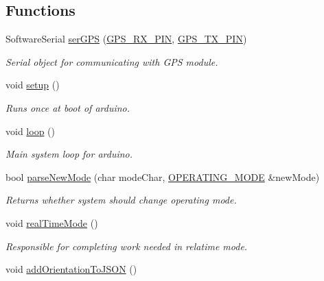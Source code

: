 \subsection*{Functions}
\begin{DoxyCompactItemize}
\item 
\mbox{\label{logging-device_8ino_aa2475f51bdc0f31d16d2916991d618d9}} 
Software\+Serial \hyperlink{logging-device_8ino_aa2475f51bdc0f31d16d2916991d618d9}{ser\+G\+PS} (\hyperlink{logging-device_8ino_a6f8927970de9eedcbb8f6c14b1d0d6c3}{G\+P\+S\+\_\+\+R\+X\+\_\+\+P\+IN}, \hyperlink{logging-device_8ino_acae14b9c1767cfec367a4b96009c94e5}{G\+P\+S\+\_\+\+T\+X\+\_\+\+P\+IN})
\begin{DoxyCompactList}\small\item\em Serial object for communicating with G\+PS module. \end{DoxyCompactList}\item 
void \hyperlink{logging-device_8ino_a4fc01d736fe50cf5b977f755b675f11d}{setup} ()
\begin{DoxyCompactList}\small\item\em Runs once at boot of arduino. \end{DoxyCompactList}\item 
void \hyperlink{logging-device_8ino_afe461d27b9c48d5921c00d521181f12f}{loop} ()
\begin{DoxyCompactList}\small\item\em Main system loop for arduino. \end{DoxyCompactList}\item 
bool \hyperlink{logging-device_8ino_aec1eb39e3cfde6331c4d29938c952c84}{parse\+New\+Mode} (char mode\+Char, \hyperlink{logging-device_8ino_a980e950615d86dadef54f3cfaefb5fb4}{O\+P\+E\+R\+A\+T\+I\+N\+G\+\_\+\+M\+O\+DE} \&new\+Mode)
\begin{DoxyCompactList}\small\item\em Returns whether system should change operating mode. \end{DoxyCompactList}\item 
void \hyperlink{logging-device_8ino_ab4c1c4c0fa047e336f9f4176406a54f1}{real\+Time\+Mode} ()
\begin{DoxyCompactList}\small\item\em Responsible for completing work needed in relatime mode. \end{DoxyCompactList}\item 
void \hyperlink{logging-device_8ino_a8d3614b16b26b9734d79e9f8f6695af3}{add\+Orientation\+To\+J\+S\+ON} ()

\end{DoxyCompactItemize}
